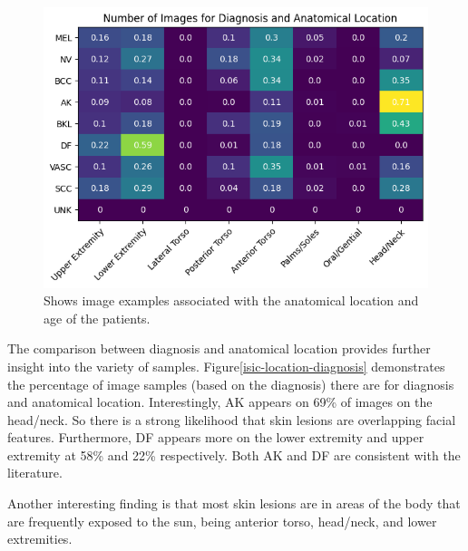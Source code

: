 
\begin{figure}
    \centering
    \includegraphics[scale=0.75]{images/ISIC/isic-location-diagnosis.png}
    \caption{Shows image examples associated with the anatomical location and age of the patients.} 
\end{figure}\label{isic-location-diagnosis}

The comparison between diagnosis and anatomical location provides further insight into the variety of samples. Figure\ref{isic-location-diagnosis} demonstrates the percentage of image samples (based on the diagnosis) there are for diagnosis and anatomical location. Interestingly, AK appears on 69\% of images on the head/neck. So there is a strong likelihood that skin lesions are overlapping facial features. Furthermore, DF appears more on the lower extremity and upper extremity at 58\% and 22\% respectively. Both AK and DF are consistent with the literature\cite{}.

Another interesting finding is that most skin lesions are in areas of the body that are frequently exposed to the sun, being anterior torso, head/neck, and lower extremities.

